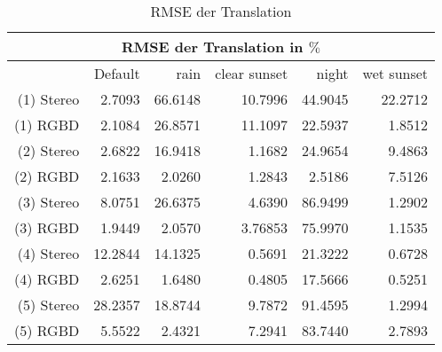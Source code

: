   \begin{table}
    \centering
      \begin{tabular}{r|r|r|r|r|r}
        \toprule %
        \multicolumn{6}{c}{RMSE der Translation in $\%$} \\
        \midrule %
        \phantom{abc} & Default & rain& clear sunset & night & wet sunset\\
        \midrule %
        (1) Stereo & 2.7093 & 66.6148 & 10.7996 & 44.9045&  22.2712\\
        \rowcolor{LightGray}
        (1) RGBD & 2.1084 & 26.8571 &11.1097 & 22.5937& 1.8512\\
        (2) Stereo & 2.6822 & 16.9418 & 1.1682 & 24.9654& 9.4863\\
        \rowcolor{LightGray}
        (2) RGBD &  2.1633 & 2.0260 & 1.2843 & 2.5186& 7.5126\\
        (3) Stereo & 8.0751 & 26.6375 & 4.6390 & 86.9499& 1.2902\\
        \rowcolor{LightGray}
        (3) RGBD & 1.9449 & 2.0570 & 3.76853 & 75.9970& 1.1535\\
  
        (4) Stereo & 12.2844 & 14.1325 &  0.5691 & 21.3222& 0.6728\\
        \rowcolor{LightGray}
        (4) RGBD & 2.6251 & 1.6480 & 0.4805 & 17.5666& 0.5251\\
        (5) Stereo & 28.2357 & 18.8744 & 9.7872 & 91.4595& 1.2994\\
        \rowcolor{LightGray}
        (5) RGBD & 5.5522 & 2.4321 & 7.2941 & 83.7440&  2.7893\\	
        \bottomrule %
      \end{tabular}
    \caption{RMSE der Translation}
  \end{table} 	